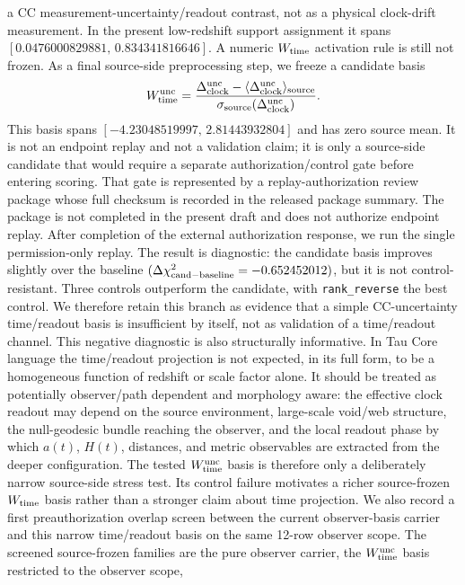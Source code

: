 \documentclass[11pt]{article}
\begin{document}
a CC measurement-uncertainty/readout contrast, not as a physical clock-drift
measurement.  In the present low-redshift support assignment it spans
\([0.0476000829881,\,0.834341816646]\).  A numeric \(W_{\rm time}\) activation
rule is still not frozen.
As a final source-side preprocessing step, we freeze a candidate basis
\[
W_{\rm time}^{\rm unc}
  =
  \frac{\Delta_{\rm clock}^{\rm unc}
        - \langle\Delta_{\rm clock}^{\rm unc}\rangle_{\rm source}}
       {\sigma_{\rm source}(\Delta_{\rm clock}^{\rm unc})}.
\]
This basis spans \([-4.23048519997,\,2.81443932804]\) and has zero source mean.
It is not an endpoint replay and not a validation claim; it is only a
source-side candidate that would require a separate authorization/control gate
before entering scoring.
That gate is represented by a replay-authorization review package whose full
checksum is recorded in the released package summary.  The package is not
completed in the present draft and does not authorize endpoint replay.
After completion of the external authorization response, we run the single
permission-only replay.  The result is diagnostic: the candidate basis improves
slightly over the baseline
\((\Delta\chi^2_{\rm cand-baseline}=-0.652452012)\), but it is not
control-resistant.  Three controls outperform the candidate, with
\texttt{rank\_\allowbreak{}reverse} the best control.  We therefore retain this branch as evidence
that a simple CC-uncertainty time/readout basis is insufficient by itself, not
as validation of a time/readout channel.
This negative diagnostic is also structurally informative.  In Tau Core
language the time/readout projection is not expected, in its full form, to be a
homogeneous function of redshift or scale factor alone.  It should be treated
as potentially observer/path dependent and morphology aware: the effective
clock readout may depend on the source environment, large-scale void/web
structure, the null-geodesic bundle reaching the observer, and the local
readout phase by which \(a(t)\), \(H(t)\), distances, and metric observables are
extracted from the deeper configuration.  The tested
\(W_{\rm time}^{\rm unc}\) basis is therefore only a deliberately narrow
source-side stress test.  Its control failure motivates a richer source-frozen
\(W_{\rm time}\) basis rather than a stronger claim about time projection.
We also record a first preauthorization overlap screen between the current
observer-basis carrier and this narrow time/readout basis on the same 12-row
observer scope.  The screened source-frozen families are the pure observer
carrier, the \(W_{\rm time}^{\rm unc}\) basis restricted to the observer scope,
\end{document}

